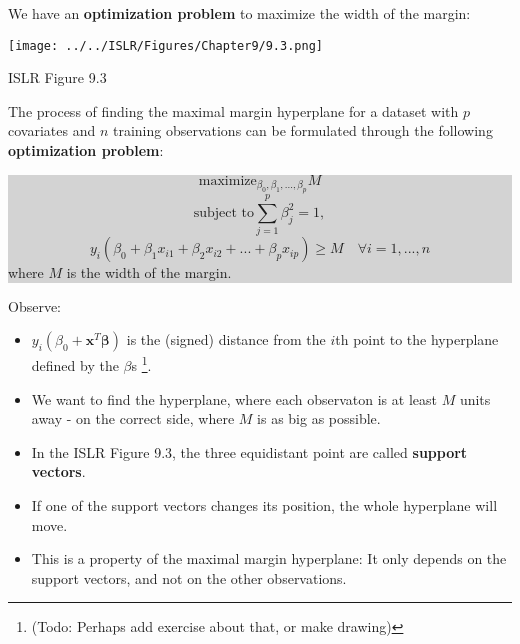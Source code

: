 \documentclass[10pt,ignorenonframetext,]{beamer}
\providecommand{\tightlist}{%
  \setlength{\itemsep}{0pt}\setlength{\parskip}{0pt}}
\begin{document}
\begin{frame}

We have an \textbf{optimization problem} to maximize the width of the
margin:

\centering
\texttt{[image: ../../ISLR/Figures/Chapter9/9.3.png]}
\small

ISLR Figure 9.3

\end{frame}

\begin{frame}

The process of finding the maximal margin hyperplane for a dataset with
\(p\) covariates and \(n\) training observations can be formulated
through the following \textbf{optimization problem}:

\colorbox{lightgray}{\begin{minipage}{10cm}
$$\mathrm{maximize}_{\beta_0,\beta_1,...,\beta_p}  M $$
$$\text{subject to} \sum_{j=1}^p \beta_j^2=1,$$
$$y_i(\beta_0+\beta_1 x_{i1}+\beta_2 x_{i2}+...+\beta_p x_{ip})\geq M \quad  \forall i=1,...,n$$
where $M$ is the width of the margin. 
\end{minipage}}

Observe: \vspace{-2mm}

\begin{itemize}
\tightlist
\item
  \(y_i(\beta_0+{\boldsymbol x}^T {\boldsymbol \beta})\) is the (signed)
  distance from the \(i\)th point to the hyperplane defined by the
  \(\beta\)s
  \footnote{(Todo: Perhaps add exercise about that, or make drawing)}.
\item
  We want to find the hyperplane, where each observaton is at least
  \(M\) units away - on the correct side, where \(M\) is as big as
  possible.
\end{itemize}

\end{frame}

\begin{frame}

\begin{itemize}
\item
  In the ISLR Figure 9.3, the three equidistant point are called
  \textbf{support vectors}.
\item
  If one of the support vectors changes its position, the whole
  hyperplane will move.
\item
  This is a property of the maximal margin hyperplane: It only depends
  on the support vectors, and not on the other observations.
\end{itemize}

\end{frame}
\end{document}
